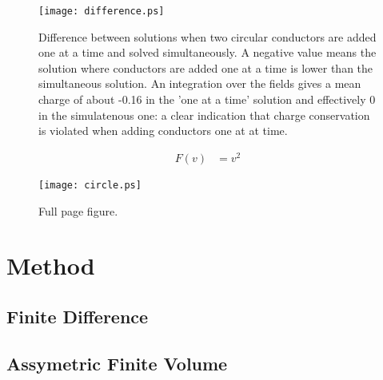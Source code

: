 \documentclass[aps,twocolumn,pre,nofootinbib]{revtex4-1}
\begin{document}

\begin{figure}
\texttt{[image: difference.ps]} 
\caption{Difference between solutions when two circular conductors are added one at a time and solved simultaneously. A negative value means the solution where conductors are added one at a time is lower than the simultaneous solution. An integration over the fields gives a mean charge of about -0.16 in the 'one at a time' solution and effectively 0 in the simulatenous one: a clear indication that charge conservation is violated when adding conductors one at at time.}
\label{fig:difference}
\end{figure}
 
\begin{equation}
\begin{split}
F(v) &= v^2 
\end{split}
\label{Simple example}
\end{equation}



\begin{figure*}

\texttt{[image: circle.ps]} 
\caption{Full page figure.
}
\label{fig:Full}
\end{figure*}


\section{Method \label{sec:met}}

 
\subsection{Finite Difference }


\subsection{Assymetric Finite Volume }
\end{document}
